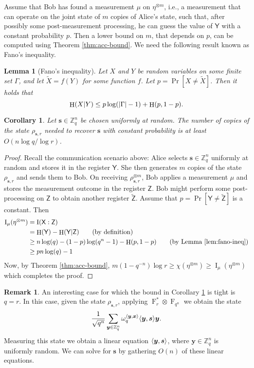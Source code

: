\documentclass[11pt]{article}
\theoremstyle{plain}
\newtheorem{lemma}[theorem]{Lemma}
\newtheorem{corollary}[theorem]{Corollary}
\theoremstyle{definition}
\newtheorem*{remark}{Remark}
\DeclareMathOperator{\entpy}{H}
\DeclareMathOperator{\qft}{F}
\DeclarePairedDelimiter{\abs}{\lvert}{\rvert}
\let\ket\relax
\DeclarePairedDelimiter{\ket}{\lvert}{\rangle}
\DeclarePairedDelimiter{\lrang}{\langle}{\rangle}
\def\Z{\mathbb{Z}}
\begin{document}
Assume that Bob has found a measurement $\mu$ on $\eta^{\otimes m}$, i.e., a measurement that can operate on the joint state of $m$ copies of Alice's state, such that, after possibly some post-measurement processing, he can guess the value of $\mathsf{Y}$ with a constant probability $p$. Then a lower bound on $m$, that depends on $p$, can be computed using Theorem \ref{thm:acc-bound}. We need the following result known as Fano's inequality.
\begin{lemma}[Fano’s inequality]
    \label{lem:fano-ineq}
    Let $X$ and $Y$ be random variables on some finite set $\Gamma$, and let $\tilde{X} = f(Y)$ for some function $f$. Let $p = \Pr[X \ne \tilde{X}]$. Then it holds that
    \[ \entpy(X \vert Y) \le p\log(\abs{\Gamma} - 1) + \entpy(p, 1 - p). \]
\end{lemma}
\begin{corollary}
    \label{cor:lower-b}
    Let $\bm{s} \in \Z_q^n$ be chosen uniformly at random. The number of copies of the state $\rho_{\bm{s}, r}$ needed to recover $\bm{s}$ with constant probability is at least $O(n\log q / \log r)$.
\end{corollary}
\begin{proof}
    Recall the communication scenario above: Alice selects $\bm{s} \in \Z_q^n$ uniformly at random and stores it in the register $\mathsf{Y}$. She then generates $m$ copies of the state $\rho_{\bm{s}, r}$ and sends them to Bob. On receiving $\rho_{\bm{s}, r}^{\otimes m}$, Bob applies a measurement $\mu$ and stores the measurement outcome in the register $\mathsf{Z}$. Bob might perform some post-processing on $\mathsf{Z}$ to obtain another register $\tilde{\mathsf{Z}}$. Assume that $p = \Pr[\mathsf{Y} \ne \tilde{\mathsf{Z}}]$ is a constant. Then
    \begin{align*}
        \operatorname{I}_\mu(\eta^{\otimes m})
        & = \operatorname{I}(\mathsf{X} : \mathsf{Z}) \\
        & = \entpy(\mathsf{Y}) - \entpy(\mathsf{Y} \vert \mathsf{Z}) \tag{by definition} \\
        & \ge n\log(q) - (1 - p)\log(q^n - 1) - \entpy(p, 1 - p) \tag{by Lemma \ref{lem:fano-ineq}} \\
        & \ge pn\log(q) - 1
    \end{align*}
    Now, by Theorem \ref{thm:acc-bound}, $m(1 - q^{-n})\log r \ge \chi(\eta^{\otimes m}) \ge \operatorname{I}_\mu(\eta^{\otimes m})$ which completes the proof.
\end{proof}
\begin{remark}
    An interesting case for which the bound in Corollary \ref{cor:lower-b} is tight is $q = r$. In this case, given the state $\rho_{\bm{s}, r}$, applying $\qft_r^* \otimes \qft_{q^n}$ we obtain the state
    \[ \frac{1}{\sqrt{q^n}} \sum_{\bm{y} \in \Z_q^n} \omega_q^{\lrang{\bm{y}, \bm{x}}} \ket{\lrang{\bm{y}, \bm{s}}}\ket{\bm{y}}. \]
    Measuring this state we obtain a linear equation $\lrang{\bm{y}, \bm{s}}$, where $\bm{y} \in \Z_q^n$ is uniformly random. We can solve for $\bm{s}$ by gathering $O(n)$ of these linear equations. 
\end{remark}
\end{document}
